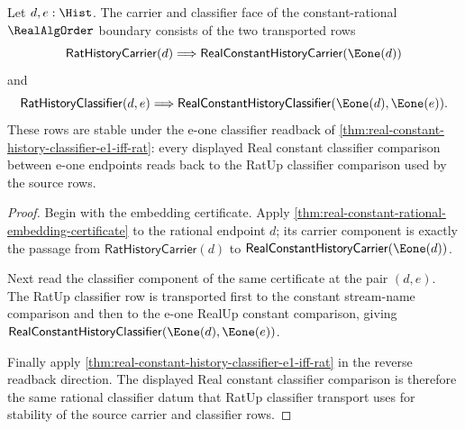 \begin{theorem}
\label{thm:realalgorder-constant-carrier-classifier-obligations}
Let $d,e:\Hist$. The carrier and classifier face of the constant-rational
$\RealAlgOrder$ boundary consists of the two transported rows
$$
\mathsf{RatHistoryCarrier}(d)
\Longrightarrow
\mathsf{RealConstantHistoryCarrier}(\Eone(d))
$$
and
$$
\mathsf{RatHistoryClassifier}(d,e)
\Longrightarrow
\mathsf{RealConstantHistoryClassifier}(\Eone(d),\Eone(e)).
$$
These rows are stable under the e-one classifier readback of
\autoref{thm:real-constant-history-classifier-e1-iff-rat}: every displayed
Real constant classifier comparison between e-one endpoints reads back to the
RatUp classifier comparison used by the source rows.
\end{theorem}
\begin{proof}
Begin with the embedding certificate. Apply
\autoref{thm:real-constant-rational-embedding-certificate} to the rational
endpoint $d$; its carrier component is exactly the passage from
$\mathsf{RatHistoryCarrier}(d)$ to
$\mathsf{RealConstantHistoryCarrier}(\Eone(d))$.

Next read the classifier component of the same certificate at the pair
$(d,e)$. The RatUp classifier row is transported first to the constant
stream-name comparison and then to the e-one RealUp constant comparison, giving
$\mathsf{RealConstantHistoryClassifier}(\Eone(d),\Eone(e))$.

Finally apply \autoref{thm:real-constant-history-classifier-e1-iff-rat} in the
reverse readback direction. The displayed Real constant classifier comparison
is therefore the same rational classifier datum that RatUp classifier transport
uses for stability of the source carrier and classifier rows.
\end{proof}

